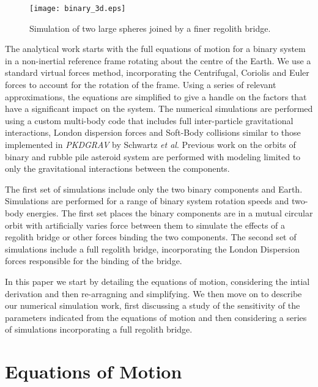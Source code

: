 \documentclass[letterpaper, preprint, paper,11pt]{AAS}	%
\begin{document}
\begin{figure}[H]
\centering
\texttt{[image: binary\_3d.eps]} 
\caption{Simulation of two large spheres joined by a finer regolith bridge.} 
\label{fig:Pic}
\end{figure} 

The analytical work starts with the full equations of motion for a binary system in a non-inertial reference frame rotating about the centre of the Earth. We use a standard virtual forces method, incorporating the Centrifugal, Coriolis and Euler forces to account for the rotation of the frame. Using a series of relevant approximations, the equations are simplified to give a handle on the factors that have a significant impact on the system. The numerical simulations are performed using a custom multi-body code that includes full inter-particle gravitational interactions, London dispersion forces and Soft-Body collisions similar to those implemented in \textit{PKDGRAV} by Schwartz \textit{et al}\cite{soft}. Previous work on the orbits of binary and rubble pile asteroid system are performed with modeling limited to only the gravitational interactions between the components. 

The first set of simulations include only the two binary components and Earth. Simulations are performed for a range of binary system rotation speeds and two-body energies. The first set places the binary components are in a mutual circular orbit with artificially varies force between them to simulate the effects of a regolith bridge or other forces binding the two components. The second set of simulations include a full regolith bridge, incorporating the London Dispersion forces responsible for the binding of the bridge.

In this paper we start by detailing the equations of motion, considering the intial derivation and then re-arragning and simplifying. We then move on to describe our numerical simulation work, first discussing a study of the sensitivity of the parameters indicated from the equations of motion and then considering a series of simulations incorporating a full regolith bridge.

\section{Equations of Motion}
\end{document}
